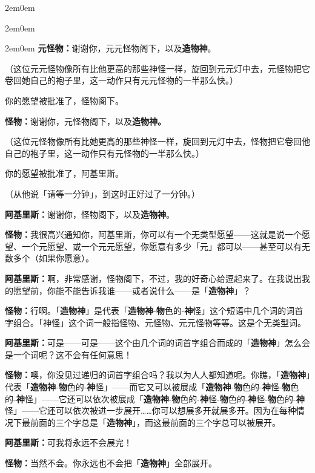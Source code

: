 \documentclass[
  12pt,
  twoside,
  openright,
  oldfontcommands,
]{memoir}
\newcommand{\heititext}[1]{{\heifamily\bfseries #1}}
\newcommand{\dialogname}[1]{{\heifamily\bfseries #1}}
\begin{document}
\begin{adjustwidth}{2em}{0em}
\begin{adjustwidth}{2em}{0em}
\begin{adjustwidth}{2em}{0em}
\dialogname{元怪物：}谢谢你，元元怪物阁下，以及\heititext{造物神}。

（这位元元怪物像所有比他更高的那些神怪一样，旋回到元元灯中去，元怪物把它卷回她自己的袍子里，这一动作只有元元怪物的一半那么快。）

你的愿望被批准了，怪物阁下。

\end{adjustwidth}

\dialogname{怪物：}谢谢你，元怪物阁下，以及\heititext{造物神。}

（这位元怪物像所有比她更高的那些神怪一样，旋回到元灯中去，怪物把它卷回他自己的袍子里，这一动作只有元怪物的一半那么快。）

你的愿望被批准了，阿基里斯。

（从他说「请等一分钟」，到这时正好过了一分钟。）

\dialogname{阿基里斯：}谢谢你，怪物阁下，以及\heititext{造物神}。

\dialogname{怪物：}我很高兴通知你，阿基里斯，你可以有一个无类型愿望------这就是说一个愿望、一个元愿望、或一个元元愿望，你愿意有多少「元」都可以------甚至可以有无数多个（如果你愿意）。

\dialogname{阿基里斯：}啊，非常感谢，怪物阁下，不过，我的好奇心给逗起来了。在我说出我的愿望前，你能不能告诉我谁------或者说什么------是「\heititext{造物神}」？

\dialogname{怪物：}行啊。「\heititext{造物神}」是代表「\heititext{造物神}-\heititext{物}色的-\heititext{神}怪」这个短语中几个词的词首字组合。「神怪」这个词一般指怪物、元怪物、元元怪物等等。这是个无类型词。

\dialogname{阿基里斯：}可是------可是------这个由几个词的词首字组合而成的「\heititext{造物神}」怎么会是一个词呢？这不会有任何意思！

\dialogname{怪物：}噢，你没见过递归的词首字组合吗？我以为人人都知道呢。你瞧，「\heititext{造物神}」代表「\heititext{造物神}-\heititext{物}色的-\heititext{神}怪」------而它又可以被展成「\heititext{造物神}-\heititext{物}色的-\heititext{神}怪-\heititext{物}色的-\heititext{神}怪」------它还可以依次被展成「\heititext{造物神}-\heititext{物}色的-\heititext{神}怪-\heititext{物}色的-\heititext{神}怪-\heititext{物}色的-\heititext{神}怪」------它还可以依次被进一步展开\ldots\ldots 你可以想展多开就展多开。因为在每种情况下最前面的三个字总是「\heititext{造物神}」，而这最前面的三个字总可以被展开。

\dialogname{阿基里斯：}可我将永远不会展完！

\dialogname{怪物：}当然不会。你永远也不会把「\heititext{造物神}」全部展开。


\end{adjustwidth}
\end{adjustwidth}
\end{document}
